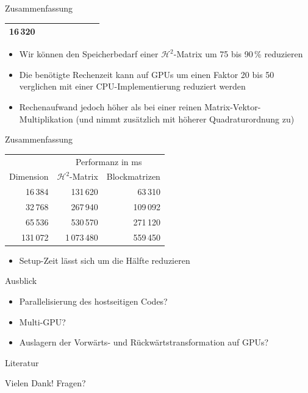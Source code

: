 \documentclass[10pt]{beamer}
\begin{document}
\begin{frame}{Zusammenfassung}
\begin{table}[ht]
{\begin{tabular}{rrrrrrrr}
         16\,320 \\
        \bottomrule
      \end{tabular}
    }
  \end{table}
  \begin{itemize}
    \item Wir können den Speicherbedarf einer \(\mathcal{H}^2\)-Matrix um
          75 bis 90\,\% reduzieren
    \item Die benötigte Rechenzeit kann auf GPUs um einen Faktor 20 bis 50
          verglichen mit einer CPU-Implementierung reduziert werden
    \item Rechenaufwand jedoch höher als bei einer reinen
          Matrix-Vektor-Multiplikation (und nimmt zusätzlich mit höherer
          Quadraturordnung zu)
  \end{itemize}
\end{frame}

\begin{frame}{Zusammenfassung}
  \small
  \begin{table}
    \begin{tabular}{rrr} \toprule
                & \multicolumn{2}{c}{Performanz in ms} \\ \cmidrule{2-3}
      Dimension & \(\mathcal{H}^2\)-Matrix & Blockmatrizen \\ \midrule
          16\,384 &                     131\,620 &   63\,310 \\
          32\,768 &                     267\,940 &  109\,092 \\
          65\,536 &                     530\,570 &  271\,120 \\
         131\,072 &                  1\,073\,480 &  559\,450 \\ \bottomrule
      \end{tabular}
    \end{table}
  \normalsize
  \begin{itemize}
    \item Setup-Zeit lässt sich um die Hälfte reduzieren
  \end{itemize}
\end{frame}

\begin{frame}{Ausblick}
  \begin{itemize}
    \item Parallelisierung des hostseitigen Codes?
    \item Multi-GPU\@?
    \item Auslagern der Vorwärts- und Rückwärtstransformation auf GPUs?
  \end{itemize}
\end{frame}

\begin{frame}[allowframebreaks]{Literatur}

  \printbibliography{}
  \nocite{*}

\end{frame}

\begin{frame}
  \centerline{\Huge Vielen Dank! Fragen?}
\end{frame}
\end{document}
